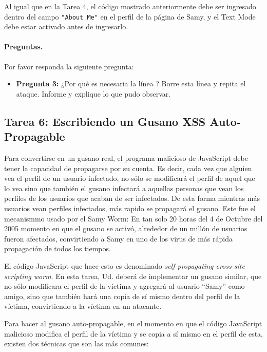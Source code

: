 Al igual que en la Tarea 4, el código mostrado anteriormente debe ser ingresado dentro del campo \texttt{"About Me"} en el perfil de la página de Samy, y el Text Mode debe estar activado antes de ingresarlo.


\paragraph{Preguntas.} Por favor responda la siguiente pregunta:


\begin{itemize}
\item \textbf{Pregunta 3:} ¿Por qué es necesaria la línea ? Borre esta línea y repita el ataque. Informe y explique lo que pudo observar.
\end{itemize}
 



\subsection{Tarea 6: Escribiendo un Gusano XSS Auto-Propagable}

Para convertirse en un gusano real, el programa malicioso de JavaScript debe tener la capacidad de propagarse por su cuenta. 
Es decir, cada vez que alguien vea el perfil de un usuario infectado, no sólo se modificará el perfil de aquel que lo vea sino que también el gusano infectará a aquellas personas que vean los perfiles de los usuarios que acaban de ser infectados. De esta forma mientras más usuarios vean perfiles infectados, más rapido se propagará el gusano.
Este fue el mecanismmo usado por el Samy Worm:
En tan solo 20 horas del 4 de Octubre del 2005 momento en que el gusano se activó, alrededor de un millón de usuarios fueron afectados, convirtiendo a Samy en uno de los virus de más rápida propagación de todos los tiempos.

El código JavaScript que hace esto es denominado
{\em self-propagating cross-site scripting worm}. En esta tarea, Ud. deberá de implementar un gusano similar, que no sólo modificara el perfil de la víctima y agregará al usuario ``Samy'' como amigo, sino que también hará una copia de sí mismo dentro del perfil de la víctima, convirtiendo a la víctima en un atacante.

Para hacer al gusano auto-propagable, en el momento en que el código JavaScript malicioso modifica el perfil de la víctima y se copia a sí mismo en el perfil de esta, existen dos técnicas que son las más comunes:


